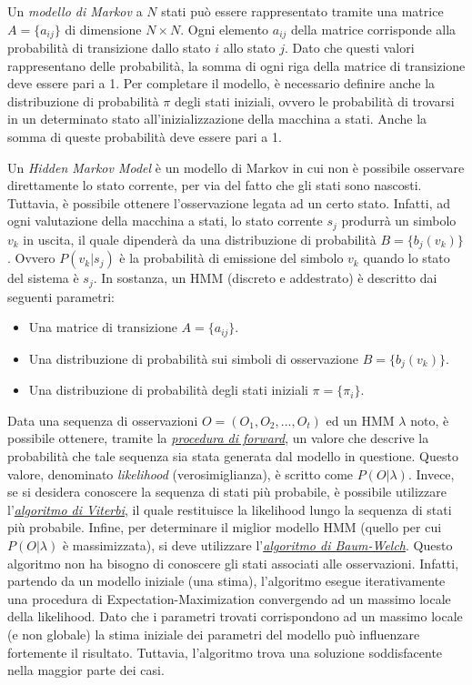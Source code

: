 \documentclass[a4paper,oneside,titlepage]{book}
\begin{document}
Un \textit{modello di Markov} a $N$ stati può essere rappresentato tramite una matrice $A = \{ a_{ij} \}$ di dimensione $N \times N$. Ogni elemento $a_{ij}$ della matrice corrisponde alla probabilità di transizione dallo stato $i$ allo stato $j$. Dato che questi valori rappresentano delle probabilità, la somma di ogni riga della matrice di transizione deve essere pari a 1. Per completare il modello, è necessario definire anche la distribuzione di probabilità $\pi$ degli stati iniziali, ovvero le probabilità di trovarsi in un determinato stato all'inizializzazione della macchina a stati. Anche la somma di queste probabilità deve essere pari a 1.

Un \textit{Hidden Markov Model} è un modello di Markov in cui non è possibile osservare direttamente lo stato corrente, per via del fatto che gli stati sono nascosti. Tuttavia, è possibile ottenere l'osservazione legata ad un certo stato. Infatti, ad ogni valutazione della macchina a stati, lo stato corrente $s_j$ produrrà un simbolo $v_k$ in uscita, il quale dipenderà da una distribuzione di probabilità $B = \{ b_j(v_k) \}$. Ovvero $P(v_k|s_j)$ è la probabilità di emissione del simbolo $v_k$ quando lo stato del sistema è $s_j$. In sostanza, un HMM (discreto e addestrato) è descritto dai seguenti parametri:
\begin{itemize}
    \item Una matrice di transizione $A = \{ a_{ij} \}$.
    \item Una distribuzione di probabilità sui simboli di osservazione $B = \{ b_j(v_k) \}$.
    \item Una distribuzione di probabilità degli stati iniziali $\pi = \{ \pi_i \}$.
\end{itemize}
\newpage
\noindent
Data una sequenza di osservazioni $O = (O_1, O_2, ..., O_t)$ ed un HMM $\lambda$ noto, è possibile ottenere, tramite la \hyperref[forward]{\textit{procedura di forward}}, un valore che descrive la probabilità che tale sequenza sia stata generata dal modello in questione. Questo valore, denominato \textit{likelihood} (verosimiglianza), è scritto come $P(O | \lambda)$. Invece, se si desidera conoscere la sequenza di stati più probabile, è possibile utilizzare l'\hyperref[Viterbi]{\textit{algoritmo di Viterbi}}, il quale restituisce la likelihood lungo la sequenza di stati più probabile. Infine, per determinare il miglior modello HMM (quello per cui $P(O|\lambda)$ è massimizzata), si deve utilizzare l'\hyperref[BW]{\textit{algoritmo di Baum-Welch}}. Questo algoritmo non ha bisogno di conoscere gli stati associati alle osservazioni. Infatti, partendo da un modello iniziale (una stima), l'algoritmo esegue iterativamente una procedura di Expectation-Maximization convergendo ad un massimo locale della likelihood. Dato che i parametri trovati corrispondono ad un massimo locale (e non globale) la stima iniziale dei parametri del modello può influenzare fortemente il risultato. Tuttavia, l'algoritmo trova una soluzione soddisfacente nella maggior parte dei casi.
\end{document}
